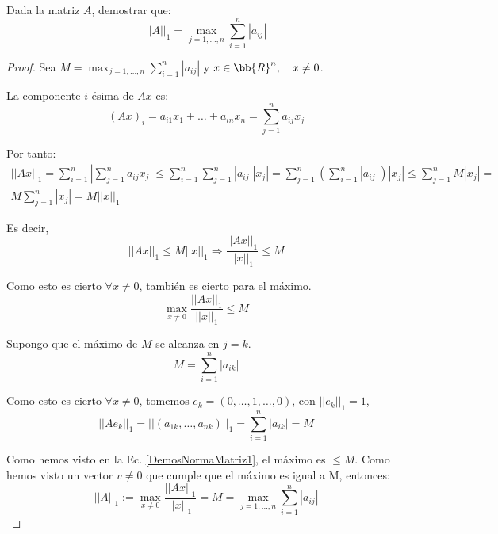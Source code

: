 \begin{prop}
    Dada la matriz $A$, demostrar que:
    $$||A||_1 = \max_{j=1,\dots,n} \sum_{i=1}^n |a_{ij}|$$
    \begin{proof}
        Sea $\displaystyle M=\max_{j=1,\dots,n} \sum_{i=1}^n |a_{ij}|$ y $x \in \bb{R}^n, \quad x\neq 0$.

        La componente $i$-ésima de $Ax$ es:
        $$(Ax)_{i} = a_{i1}x_1 + \dots + a_{in}x_n = \sum_{j=1}^na_{ij}x_j$$

        Por tanto:
        \begin{multline*}
            ||Ax||_1 = \sum_{i=1}^n \left| \sum_{j=1}^n a_{ij} x_j\right| \leq \sum_{i=1}^n\sum_{j=1}^n |a_{ij}| |x_j| = \sum_{j=1}^n \left(\sum_{i=1}^n |a_{ij}| \right)|x_j| \leq \sum_{j=1}^n M|x_j| = \\
            M \sum_{j=1}^n|x_j| = M||x||_1
        \end{multline*}

        Es decir, $$||Ax||_1 \leq M||x||_1 \Longrightarrow \frac{||Ax||_1}{||x||_1} \leq M$$

        Como esto es cierto $\forall x\neq 0$, también es cierto para el máximo.
        \begin{equation} \label{DemosNormaMatriz1}
            \max_{x\neq 0} \frac{||Ax||_1}{||x||_1} \leq M
        \end{equation}

        Supongo que el máximo de $M$ se alcanza en $j=k$.
        $$M = \sum_{i=1}^n |a_{ik}|$$

        Como esto es cierto $\forall x\neq 0$, tomemos $e_k = (0,\dots,1,\dots,0)$, con $||e_k||_1=1$,
        $$||Ae_k||_1 = ||(a_{1k}, \dots, a_{nk})||_1 = \sum_{i=1}^n |a_{ik}| = M$$

        Como hemos visto en la Ec. \ref{DemosNormaMatriz1}, el máximo es $\leq M$. Como hemos visto un vector $v\neq 0$ que cumple que el máximo es igual a M, entonces:
        $$||A||_1 :=  \max_{x\neq 0} \frac{||Ax||_1}{||x||_1} = M = \max_{j=1,\dots,n} \sum_{i=1}^n |a_{ij}|$$
        
    \end{proof}
\end{prop}

